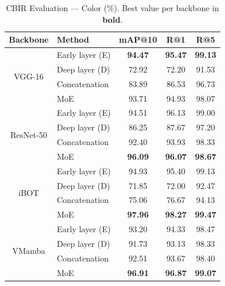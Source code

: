 \documentclass[letterpaper, 10 pt, conference]{ieeeconf}
\begin{document}
\begin{table}[htbp]
\caption{CBIR Evaluation --- Color (\%). Best value per backbone in
         \textbf{bold}.}
\begin{center}
\begin{tabular}{c|l|c|c|c}
\hline
\textbf{Backbone} & \textbf{Method} & \textbf{mAP@10}
                  & \textbf{R@1} & \textbf{R@5} \\
\hline
\multirow{4}{*}{VGG-16}
  & Early layer (E)         & \textbf{94.47} & \textbf{95.47} & \textbf{99.13} \\
  & Deep layer (D)          & 72.92 & 72.20 & 91.53 \\
  & Concatenation           & 83.89 & 86.53 & 96.73 \\
  & MoE & 93.71 & 94.93 & 98.07 \\
\hline
\multirow{4}{*}{ResNet-50}
  & Early layer (E)         & 94.51 & 96.13 & 99.00 \\
  & Deep layer (D)          & 86.25 & 87.67 & 97.20 \\
  & Concatenation           & 92.40 & 93.93 & 98.33 \\
  & MoE & \textbf{96.09} & \textbf{96.07} & \textbf{98.67} \\
\hline
\multirow{4}{*}{iBOT}
  & Early layer (E)         & 94.93 & 95.40 & 99.13 \\
  & Deep layer (D)          & 71.85 & 72.00 & 92.47 \\
  & Concatenation           & 75.06 & 76.67 & 94.13 \\
  & MoE & \textbf{97.96} & \textbf{98.27} & \textbf{99.47} \\
\hline
\multirow{4}{*}{VMamba}
  & Early layer (E)         & 93.20 & 94.33 & 98.47 \\
  & Deep layer (D)          & 91.73 & 93.13 & 98.33 \\
  & Concatenation           & 92.51 & 93.67 & 98.40 \\
  & MoE & \textbf{96.91} & \textbf{96.87} & \textbf{99.07} \\
\hline
\end{tabular}
\label{tab_cbir_color}
\end{center}
\end{table}
\end{document}
